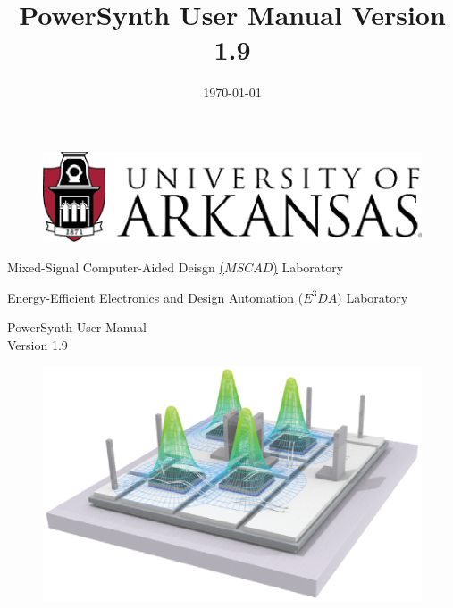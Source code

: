 \documentclass[11pt]{article}
\date{\today}
\title{PowerSynth User Manual Version 1.9}
\renewcommand\maketitle{}
\begin{document}
\maketitle
\begin{titlepage}
\begin{center}

\begin{figure}[h!]
  \centering
  \includegraphics[width=0.4\linewidth]{./figs/00_UarkLogo.eps}
\end{figure}

{\Large Mixed-Signal Computer-Aided Deisgn \href{https://mscad.uark.edu/}{(\underline{$MSCAD$})}  Laboratory \par}
{\Large Energy-Efficient Electronics and Design Automation \href{https://e3da.csce.uark.edu/}{(\underline{$E^3DA$})} Laboratory \par}
\vspace{2cm}
{\Huge PowerSynth User Manual\\ Version 1.9 \par}
\vspace{1cm}

\vspace{1cm}

\begin{figure}[h!]
  \centering
  \includegraphics[width=\linewidth]{./figs/00_PS.eps}
\end{figure}

\end{center}
\end{titlepage}
\end{document}
